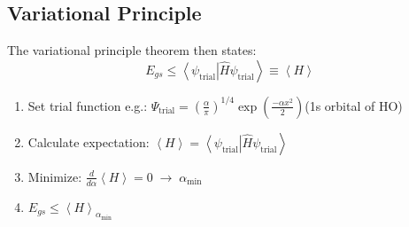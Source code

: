 \subsection{Variational Principle}
The variational principle theorem then states:
\begin{equation*}
    E_{gs}\leq\left\langle\psi_{\mathrm{trial}}\right|\widehat{H} \psi_{\mathrm{trial}}\left.\right\rangle \equiv \left<H\right>
\end{equation*}

\begin{enumerate}
    \item Set trial function e.g.: $\Psi_{\mathrm{trial}}={\left(\frac{\alpha}{\pi}\right)}^{1/4}\exp\left(\frac{-\alpha x^{2}}{2}\right)$\newline (1s orbital of HO)
    \item Calculate expectation: $\left\langle H\right\rangle= \left\langle\psi_{\mathrm{trial}}\right|\widehat{H} \psi_{\mathrm{trial}}\left.\right\rangle$
    \item Minimize: $\frac{d}{d \alpha} \left\langle H\right\rangle=0\;\to\; \alpha_{\min}$ 
    \item $E_{gs}\leq {\left\langle H \right\rangle}_{\alpha_{\min}}$
\end{enumerate}